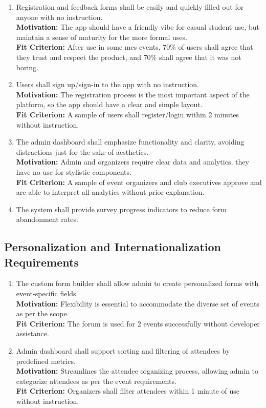 \documentclass[12pt]{article}
\begin{document}
\begin{enumerate}[label=UHR-EoU.\arabic*, wide=0pt, leftmargin=*]
  \item \label{UHEUR1} Registration and feedback forms shall be easily and quickly filled out for anyone with no instruction.\\[2mm]
    {\bf Motivation:} The app should have a friendly vibe for casual student use, but maintain a sense of maturity for the more formal uses.\\
    {\bf Fit Criterion:} After use in some \gls{mes} events, 70\% of users shall agree that they trust and respect the product, and 70\% shall agree that it was not boring.
  \item \label{UHEUR2} Users shall sign up/sign-in to the app with no instruction. \\[2mm]
    {\bf Motivation:} The registration process is the most important aspect of the platform, so the app should have a clear and simple layout.\\
    {\bf Fit Criterion:} A sample of users shall register/login within 2 minutes without instruction.
  \item \label{UHEUR3} The admin dashboard shall emphasize functionality and clarity, avoiding distractions just for the sake of aesthetics.\\[2mm]
    {\bf Motivation:} Admin and organizers require clear data and analytics, they have no use for stylistic components.\\
    {\bf Fit Criterion:} A sample of event organizers and club executives approve and are able to interpret all analytics without prior explanation.
  \item \label{UHEUR4} The system shall provide survey progress indicators to reduce form abandonment
    rates.
\end{enumerate}

\subsection{Personalization and Internationalization Requirements}
\begin{enumerate}[label=UHR-PIR.\arabic*, wide=0pt, leftmargin=*]
  \item \label{UHPIR1} The custom form builder shall allow admin to create personalized forms with event-specific fields.\\[2mm]
    {\bf Motivation:} Flexibility is essential to accommodate the diverse set of events as per the scope.\\
    {\bf Fit Criterion:} The forum is used for 2 events successfully without developer assistance.
  \item \label{UHPIR2} Admin dashboard shall support sorting and filtering of attendees by predefined metrics.\\[2mm]
    {\bf Motivation:} Streamlines the attendee organizing process, allowing admin to categorize attendees as per the event requirements.\\
    {\bf Fit Criterion:} Organizers shall filter attendees within 1 minute of use without instruction.
\end{enumerate}
\end{document}
